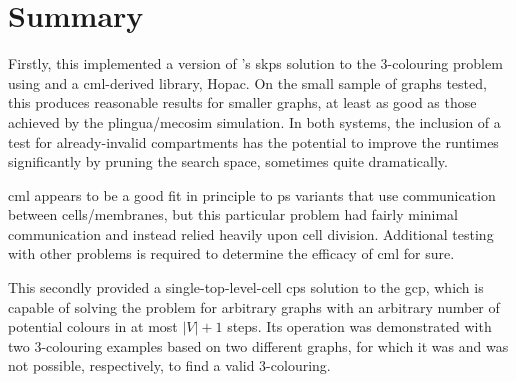 \section{\label{sec:gcol:conc}Summary}
Firstly, this  implemented a version of \citeauthor{Gheorghe2013}'s \gls{skps} solution to the 3-colouring problem using \fsharp{} and a \gls{cml}-derived library, Hopac.   On the small sample of graphs tested, this produces reasonable results for smaller graphs, at least as good as those achieved by the \gls{plingua}/\gls{mecosim} simulation.  In both systems, the inclusion of a test for already-invalid \glspl{compartment} has the potential to improve the runtimes significantly by pruning the search space, sometimes quite dramatically.

\Gls{cml} appears to be a good fit in principle to \gls{ps} variants that use communication between cells/membranes, but this particular problem had fairly minimal communication and instead relied heavily upon cell division.  Additional testing with other problems is required to determine the efficacy of \gls{cml} for sure.

This  secondly provided a single-top-level-cell \gls{cps} solution to the \gls{gcp}, which is capable of solving the problem for arbitrary graphs with an arbitrary number of potential colours in at most \(|V| + 1\) steps.  Its operation was demonstrated with two 3-colouring examples based on two different graphs, for which it was and was not possible, respectively, to find a valid 3-colouring.
